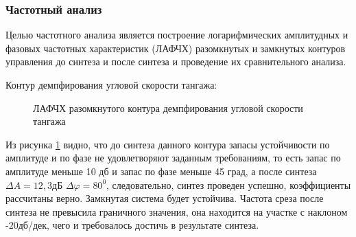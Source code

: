 \subsubsection{Частотный анализ}

Целью частотного анализа является построение логарифмических амплитудных и фазовых частотных характеристик (ЛАФЧХ) разомкнутых и замкнутых контуров управления до синтеза и после синтеза и проведение их сравнительного анализа.

\begin{center}
    Контур демпфирования угловой скорости тангажа:
\end{center}

\begin{figure}[H]
    \caption{ЛАФЧХ разомкнутого контура демпфирования угловой скорости тангажа}
    \label{fig:Угловая скорость тангажа раз qMIN}
\end{figure}

Из рисунка \ref{fig:Угловая скорость тангажа раз qMIN} видно, что до синтеза данного контура запасы устойчивости по амплитуде и по фазе не удовлетворяют заданным требованиям, то есть запас по амплитуде меньше 10 дб и запас по фазе меньше 45 град, а после синтеза $\Delta A = 12,3$дБ $\Delta \varphi = 80^0$, следовательно, синтез проведен успешно, коэффициенты рассчитаны верно. Замкнутая система будет устойчива. Частота среза после синтеза не превысила граничного значения, она находится на участке с наклоном -20дб/дек, чего и требовалось достичь в результате синтеза.  

